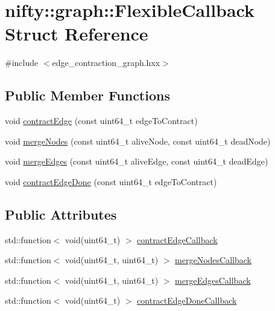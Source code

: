 \hypertarget{structnifty_1_1graph_1_1FlexibleCallback}{}\section{nifty\+:\+:graph\+:\+:Flexible\+Callback Struct Reference}
\label{structnifty_1_1graph_1_1FlexibleCallback}


{\ttfamily \#include $<$edge\+\_\+contraction\+\_\+graph.\+hxx$>$}

\subsection*{Public Member Functions}
\begin{DoxyCompactItemize}
\item 
void \hyperlink{structnifty_1_1graph_1_1FlexibleCallback_add51f6940731aa31df4678f23c8ca664}{contract\+Edge} (const uint64\+\_\+t edge\+To\+Contract)
\item 
void \hyperlink{structnifty_1_1graph_1_1FlexibleCallback_aac9ed0c77a9fc3a45381c31394a757ea}{merge\+Nodes} (const uint64\+\_\+t alive\+Node, const uint64\+\_\+t dead\+Node)
\item 
void \hyperlink{structnifty_1_1graph_1_1FlexibleCallback_a3431adaf5f74774a1527f1a477872b31}{merge\+Edges} (const uint64\+\_\+t alive\+Edge, const uint64\+\_\+t dead\+Edge)
\item 
void \hyperlink{structnifty_1_1graph_1_1FlexibleCallback_aee1f9369e0f2d4dafddf5fc47c45b002}{contract\+Edge\+Done} (const uint64\+\_\+t edge\+To\+Contract)
\end{DoxyCompactItemize}
\subsection*{Public Attributes}
\begin{DoxyCompactItemize}
\item 
std\+::function$<$ void(uint64\+\_\+t) $>$ \hyperlink{structnifty_1_1graph_1_1FlexibleCallback_a256c9d832090fe82b2f7fdb9f6e07920}{contract\+Edge\+Callback}
\item 
std\+::function$<$ void(uint64\+\_\+t, uint64\+\_\+t) $>$ \hyperlink{structnifty_1_1graph_1_1FlexibleCallback_a4c4b807ea5750a1f894b7e9a6c7598fa}{merge\+Nodes\+Callback}
\item 
std\+::function$<$ void(uint64\+\_\+t, uint64\+\_\+t) $>$ \hyperlink{structnifty_1_1graph_1_1FlexibleCallback_af2693627ec37eef058bc9b4e22581e75}{merge\+Edges\+Callback}
\item 
std\+::function$<$ void(uint64\+\_\+t) $>$ \hyperlink{structnifty_1_1graph_1_1FlexibleCallback_a57ddb7dd27b885a94ee81526db535ea7}{contract\+Edge\+Done\+Callback}
\end{DoxyCompactItemize}



